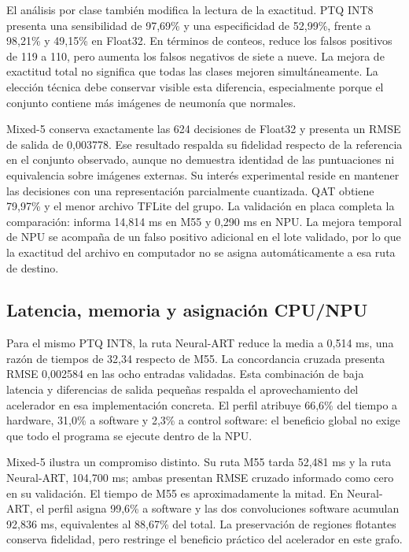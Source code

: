 El análisis por clase también modifica la lectura de la exactitud. PTQ INT8 presenta una sensibilidad de 97,69\% y una especificidad de 52,99\%, frente a 98,21\% y 49,15\% en Float32. En términos de conteos, reduce los falsos positivos de 119 a 110, pero aumenta los falsos negativos de siete a nueve. La mejora de exactitud total no significa que todas las clases mejoren simultáneamente. La elección técnica debe conservar visible esta diferencia, especialmente porque el conjunto contiene más imágenes de neumonía que normales.

Mixed-5 conserva exactamente las 624 decisiones de Float32 y presenta un RMSE de salida de 0,003778. Ese resultado respalda su fidelidad respecto de la referencia en el conjunto observado, aunque no demuestra identidad de las puntuaciones ni equivalencia sobre imágenes externas. Su interés experimental reside en mantener las decisiones con una representación parcialmente cuantizada. QAT obtiene 79,97\% y el menor archivo TFLite del grupo. La validación en placa completa la comparación: informa 14,814 ms en M55 y 0,290 ms en NPU. La mejora temporal de NPU se acompaña de un falso positivo adicional en el lote validado, por lo que la exactitud del archivo en computador no se asigna automáticamente a esa ruta de destino.

\subsection{Latencia, memoria y asignación CPU/NPU}
Para el mismo PTQ INT8, la ruta Neural-ART reduce la media a 0,514 ms, una razón de tiempos de 32,34 respecto de M55. La concordancia cruzada presenta RMSE 0,002584 en las ocho entradas validadas. Esta combinación de baja latencia y diferencias de salida pequeñas respalda el aprovechamiento del acelerador en esa implementación concreta. El perfil atribuye 66,6\% del tiempo a hardware, 31,0\% a software y 2,3\% a control software: el beneficio global no exige que todo el programa se ejecute dentro de la NPU.

Mixed-5 ilustra un compromiso distinto. Su ruta M55 tarda 52,481 ms y la ruta Neural-ART, 104,700 ms; ambas presentan RMSE cruzado informado como cero en su validación. El tiempo de M55 es aproximadamente la mitad. En Neural-ART, el perfil asigna 99,6\% a software y las dos convoluciones software acumulan 92,836 ms, equivalentes al 88,67\% del total. La preservación de regiones flotantes conserva fidelidad, pero restringe el beneficio práctico del acelerador en este grafo.

